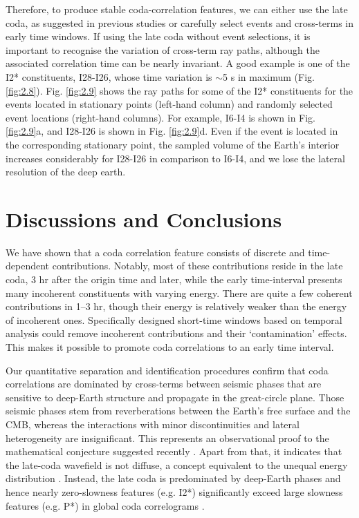 Therefore, to produce stable coda-correlation features, we can either use the late coda, as suggested in previous studies \citep[e.g.,][]{lin_seismic_2013,poli_analysis_2017}  or carefully select events and cross-terms in early time windows. If using the late coda without event selections, it is important to recognise the variation of cross-term ray paths, although the associated correlation time can be nearly invariant. A good example is one of the I2* constituents, I28-I26, whose time variation is $\sim$5 s in maximum (Fig. \ref{fig:2.8}). Fig. \ref{fig:2.9} shows the ray paths for some of the I2* constituents for the events located in stationary points (left-hand column) and randomly selected event locations (right-hand columns). For example, I6-I4 is shown in Fig. \ref{fig:2.9}a, and I28-I26 is shown in  Fig. \ref{fig:2.9}d. Even if the event is located in the corresponding stationary point, the sampled volume of the Earth's interior increases considerably for I28-I26 in comparison to I6-I4, and we lose the lateral resolution of the deep earth.


\section{Discussions and Conclusions}

We have shown that a coda correlation feature consists of discrete and time-dependent contributions. Notably, most of these contributions reside in the late coda, 3 hr after the origin time and later, while the early time-interval presents many incoherent constituents with varying energy. There are quite a few coherent contributions in 1--3 hr, though their energy is relatively weaker than the energy of incoherent ones. Specifically designed short-time windows based on temporal analysis could remove incoherent contributions and their `contamination' effects. This makes it possible to promote coda correlations to an early time interval.

Our quantitative separation and identification procedures confirm that coda correlations are dominated by cross-terms between seismic phases that are sensitive to deep-Earth structure and propagate in the great-circle plane. Those seismic phases stem from reverberations between the Earth's free surface and the CMB, whereas the interactions with minor discontinuities and lateral heterogeneity are insignificant. This represents an observational proof to the mathematical conjecture suggested recently  \citep{pham_earths_2018,tkalcic_shear_2018,kennett_nature_2018}. Apart from that, it indicates that the late-coda wavefield is not diffuse, a concept equivalent to the unequal energy distribution \citep{maeda_constituents_2006,sens-schonfelder_lack_2015,poli_analysis_2017}. Instead, the late coda is predominated by deep-Earth phases and hence nearly zero-slowness features (e.g. I2*) significantly exceed large slowness features (e.g. P*) in global coda correlograms \citep[][;Fig. \ref{fig:2.2}]{boue_reverberations_2014,pham_earths_2018}.

